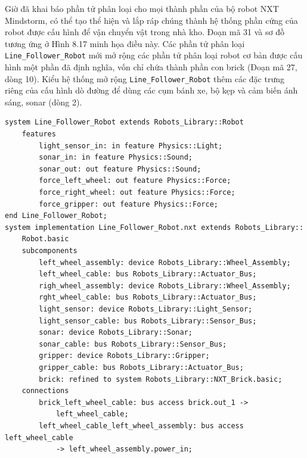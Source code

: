 Giờ đã khai báo phần tử phân loại cho mọi thành phần của bộ robot NXT Mindstorm, có thể tạo thể hiện và lắp ráp chúng thành hệ thống phần cứng của robot được cấu hình để vận chuyển vật trong nhà kho. Đoạn mã 31 và sơ đồ tương ứng ở Hình 8.17 minh họa điều này. Các phần tử phân loại \texttt{Line\_Follower\_Robot} mới mở rộng các phần tử phân loại robot cơ bản được cấu hình một phần đã định nghĩa, vốn chỉ chứa thành phần con brick (Đoạn mã 27, dòng 10). Kiểu hệ thống mở rộng \texttt{Line\_Follower\_Robot} thêm các đặc trưng riêng của cấu hình dò đường để dùng các cụm bánh xe, bộ kẹp và cảm biến ánh sáng, sonar (dòng 2).
\begin{verbatim}
system Line_Follower_Robot extends Robots_Library::Robot
    features
        light_sensor_in: in feature Physics::Light;
        sonar_in: in feature Physics::Sound;
        sonar_out: out feature Physics::Sound;
        force_left_wheel: out feature Physics::Force;
        force_right_wheel: out feature Physics::Force;
        force_gripper: out feature Physics::Force;
end Line_Follower_Robot;
system implementation Line_Follower_Robot.nxt extends Robots_Library::
    Robot.basic
    subcomponents
        left_wheel_assembly: device Robots_Library::Wheel_Assembly;
        left_wheel_cable: bus Robots_Library::Actuator_Bus;
        righ_wheel_assembly: device Robots_Library::Wheel_Assembly;
        rght_wheel_cable: bus Robots_Library::Actuator_Bus;
        light_sensor: device Robots_Library::Light_Sensor;
        light_sensor_cable: bus Robots_Library::Sensor_Bus;
        sonar: device Robots_Library::Sonar;
        sonar_cable: bus Robots_Library::Sensor_Bus;
        gripper: device Robots_Library::Gripper;
        gripper_cable: bus Robots_Library::Actuator_Bus;
        brick: refined to system Robots_Library::NXT_Brick.basic;
    connections
        brick_left_wheel_cable: bus access brick.out_1 ->
            left_wheel_cable;
        left_wheel_cable_left_wheel_assembly: bus access left_wheel_cable
            -> left_wheel_assembly.power_in;
\end{verbatim}
